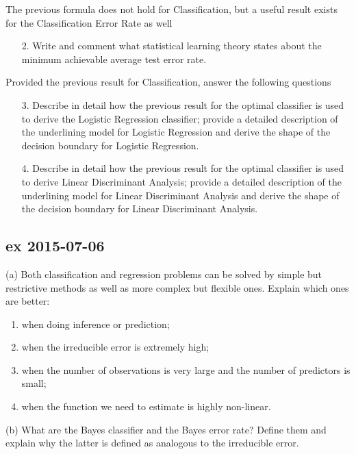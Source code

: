 \documentclass[a4paper,12pt,titlepage]{article} %
\begin{document}
The previous formula does not hold for Classification, but a useful result exists for the Classification Error Rate as well

\begin{itemize}
\item[2.] Write and comment what statistical learning theory states about the minimum achievable average test error rate.
\end{itemize}

Provided the previous result for Classification, answer the following questions

\begin{itemize}
\item[3.] Describe in detail how the previous result for the optimal classifier is used to derive the Logistic Regression classifier; provide a detailed description of the underlining model for Logistic Regression and derive the shape of the decision boundary for Logistic Regression.
\item[4.] Describe in detail how the previous result for the optimal classifier is used to derive Linear Discriminant Analysis; provide a detailed description of the underlining model for Linear Discriminant Analysis and derive the shape of the decision boundary for Linear Discriminant Analysis.
\end{itemize}

\subsection{ex 2015-07-06}
(a) Both classification and regression problems can be solved by simple but restrictive methods as well as more complex but flexible ones. Explain which ones are better:
\begin{enumerate}
\item when doing inference or prediction;
\item when the irreducible error is extremely high;
\item when the number of observations is very large and the number of predictors is small;
\item when the function we need to estimate is highly non-linear.
\end{enumerate}
(b) What are the Bayes classifier and the Bayes error rate? Define them and explain why the latter is defined as analogous to the irreducible error.
\end{document}
